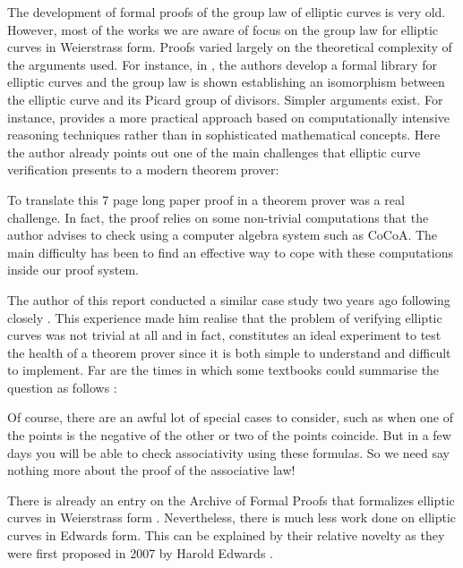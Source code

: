 The development of formal proofs of the group law of elliptic curves is very old. However, most of the works we are aware of focus on the group law for elliptic curves in Weierstrass form. Proofs varied largely on the theoretical complexity of the arguments used. For instance, in \cite{bartzia2014formal}, the authors develop a formal library for elliptic curves and the group law is shown establishing an isomorphism between the elliptic curve and its Picard group of divisors. Simpler arguments exist. For instance, \cite{thery2007proving} provides a more practical approach based on computationally intensive reasoning techniques rather than in sophisticated mathematical concepts. Here the author already points out one of the main challenges that elliptic curve verification presents to a modern theorem prover: 

\begin{displayquote}
To translate this 7 page long paper proof in a theorem prover was a real challenge. In fact, the proof relies on some non-trivial computations that the author advises to check using a computer algebra system such as CoCoA. The main difficulty has been to find an effective way to cope with these computations inside our proof system. 
\end{displayquote}

The author of this report conducted a similar case study two years ago \cite{techreport} following closely \cite{russinoff2017computationally}. This experience made him realise that the problem of verifying elliptic curves was not trivial at all and in fact, constitutes an ideal experiment to test the health of a theorem prover since it is both simple to understand and difficult to implement. Far are the times in which some textbooks could summarise the question as follows \cite{silverman1992rational}:

\begin{displayquote}
Of course, there are an awful lot of special cases to consider, such as when one of the points is the negative of the other or two of the points coincide. But in a few days you will be able to check associativity using these formulas. So we need say nothing more about the proof of the associative law!
\end{displayquote}

There is already an entry on the Archive of Formal Proofs that formalizes elliptic curves in Weierstrass form \cite{Elliptic_Curves_Group_Law-AFP}. Nevertheless, there is much less work done on elliptic curves in Edwards form. This can be explained by their relative novelty as they were first proposed in 2007 by Harold Edwards \cite{edwards2007normal}. 

